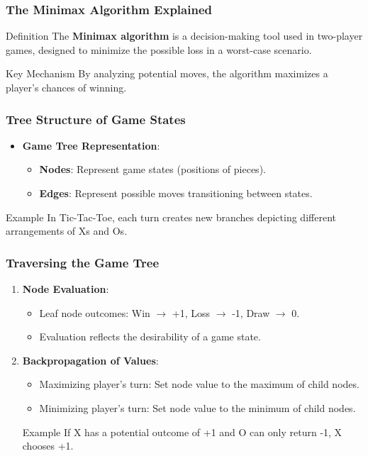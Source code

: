 \documentclass[aspectratio=169]{beamer}
\begin{document}
\begin{frame}
    \frametitle{The Minimax Algorithm Explained}
    \begin{block}{Definition}
        The \textbf{Minimax algorithm} is a decision-making tool used in two-player games, designed to minimize the possible loss in a worst-case scenario. 
    \end{block}
    \begin{block}{Key Mechanism}
        By analyzing potential moves, the algorithm maximizes a player's chances of winning.
    \end{block}
\end{frame}

\begin{frame}
    \frametitle{Tree Structure of Game States}
    \begin{itemize}
        \item \textbf{Game Tree Representation}: 
        \begin{itemize}
            \item \textbf{Nodes}: Represent game states (positions of pieces).
            \item \textbf{Edges}: Represent possible moves transitioning between states.
        \end{itemize}
    \end{itemize}
    \begin{block}{Example}
        In Tic-Tac-Toe, each turn creates new branches depicting different arrangements of Xs and Os.
    \end{block}
\end{frame}

\begin{frame}
    \frametitle{Traversing the Game Tree}
    \begin{enumerate}
        \item \textbf{Node Evaluation}:
            \begin{itemize}
                \item Leaf node outcomes: Win $\rightarrow$ +1, Loss $\rightarrow$ -1, Draw $\rightarrow$ 0.
                \item Evaluation reflects the desirability of a game state.
            \end{itemize}
        \item \textbf{Backpropagation of Values}:
            \begin{itemize}
                \item Maximizing player's turn: Set node value to the maximum of child nodes.
                \item Minimizing player's turn: Set node value to the minimum of child nodes.
            \end{itemize}
            \begin{block}{Example}
                If X has a potential outcome of +1 and O can only return -1, X chooses +1.
            \end{block}
    \end{enumerate}
\end{frame}
\end{document}
